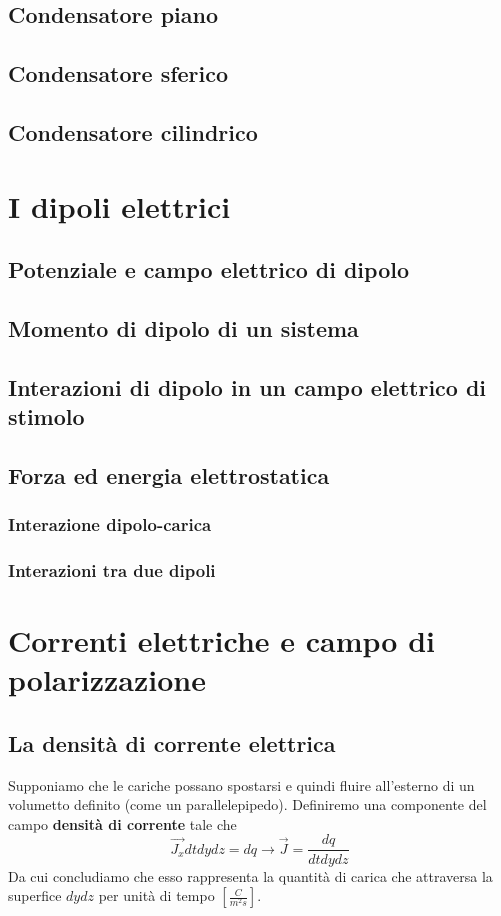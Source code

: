 \documentclass{book}
\begin{document}
\section{Condensatore piano}
\section{Condensatore sferico}
\section{Condensatore cilindrico}

\chapter{I dipoli elettrici}
\section{Potenziale e campo elettrico di dipolo}
\section{Momento di dipolo di un sistema}
\section{Interazioni di dipolo in un campo elettrico di stimolo}
\section{Forza ed energia elettrostatica}
\subsection{Interazione dipolo-carica}
\subsection{Interazioni tra due dipoli}

\chapter{Correnti elettriche e campo di polarizzazione}
\section{La densit\`a di corrente elettrica}
Supponiamo che le cariche possano spostarsi e quindi fluire all'esterno di un volumetto definito (come un parallelepipedo).
Definiremo una componente del campo \textbf{densità di corrente} tale che
\[
  \vec{J_x} dt dy dz = dq \rightarrow \vec{J} = \frac{dq}{dt dy dz}
\]
Da cui concludiamo che esso rappresenta la quantità di carica che attraversa la superfice $dydz$ per unità di tempo $\left[\frac{C}{m^2s}\right]$.
\end{document}
